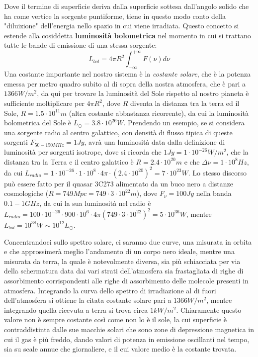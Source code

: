 \documentclass[a4paper,twoside,openany,notitlepage]{book}
\newcommand{\e}[1]{\cdot 10^{#1}}
\theoremstyle{definition}
\theoremstyle{plain}
\begin{document}
Dove il termine di superficie deriva dalla superficie sottesa dall'angolo solido che ha come vertice la sorgente puntiforme, tiene in questo modo conto della "diluizione" dell'energia nello spazio in cui viene irradiata. Questo concetto si estende alla cosiddetta \textbf{luminosità bolometrica} nel momento in cui si trattano tutte le bande di emissione di una stessa sorgente:
\begin{equation*}
	L_{bol} = 4\pi R^2 \int_{-\infty}^{+\infty} F(\nu) d\nu
\end{equation*}
Una costante importante nel nostro sistema è la \textit{costante solare}, che è la potenza emessa per metro quadro subito al di sopra della nostra atmosfera, che è pari a $1366W/m^2$, da qui per trovare la luminosità del Sole rispetto al nostro pianeta è sufficiente moltiplicare per $4\pi R^2$, dove $R$ diventa la distanza tra la terra ed il Sole, $R=1.5\e{11}m$ (altra costante abbastanza ricorrente), da cui la luminosità bolometrica del Sole è $L_\odot=3.8\e{26}W$. Prendendo un esempio, se si considera una sorgente radio al centro galattico, con densità di flusso tipica di queste sorgenti $F_{50-150MHz}=1Jy$, avrà una luminosità data dalla definizione di luminosità per sorgenti isotrope, dove si ricorda che $1Jy=1\e{-26}W/m^2$, che la distanza tra la Terra e il centro galattico è $R=2.4\e{20}m$ e che $\Delta\nu=1\e{8}Hz$, da cui $L_{radio} = 1\e{-26} \cdot 1\e{8} \cdot 4\pi \cdot (2.4\e{20})^2=7\e{23}W$. Lo stesso discorso può essere fatto per il quasar 3C273 alimentato da un buco nero a distanze cosmologiche ($R=749Mpc=749 \cdot 3\e{22}m$), dove $F_\nu=100Jy$ nella banda $0.1-1GHz$, da cui la sua luminosità nel radio è $L_{radio} = 100\e{-26} \cdot 900\e{6} \cdot 4\pi (749 \cdot 3\e{22})^2 = 5\e{36}W$, mentre $L_{bol} = 10^{38}W\sim10^{12}L_\odot$.

Concentrandoci sullo spettro solare, ci saranno due curve, una misurata in orbita e che approssimerà meglio l'andamento di un corpo nero ideale, mentre una misurata da terra, la quale è notevolmente diversa, sia più schiacciata per via della schermatura data dai vari strati dell'atmosfera sia frastagliata di righe di assorbimento corrispondenti alle righe di assorbimento delle molecole presenti in atmosfera. Integrando la curva dello spettro di irradiazione al di fuori dell'atmosfera si ottiene la citata costante solare pari a $1366W/m^2$, mentre integrando quella ricevuta a terra si trova circa $1kW/m^2$. Chiaramente questo valore non è sempre costante così come non lo è il sole, la cui superficie è contraddistinta dalle sue macchie solari che sono zone di depressione magnetica in cui il gas è più freddo, dando valori di potenza in emissione oscillanti nel tempo, sia su scale annue che giornaliere, e il cui valore medio è la costante trovata.
\end{document}
